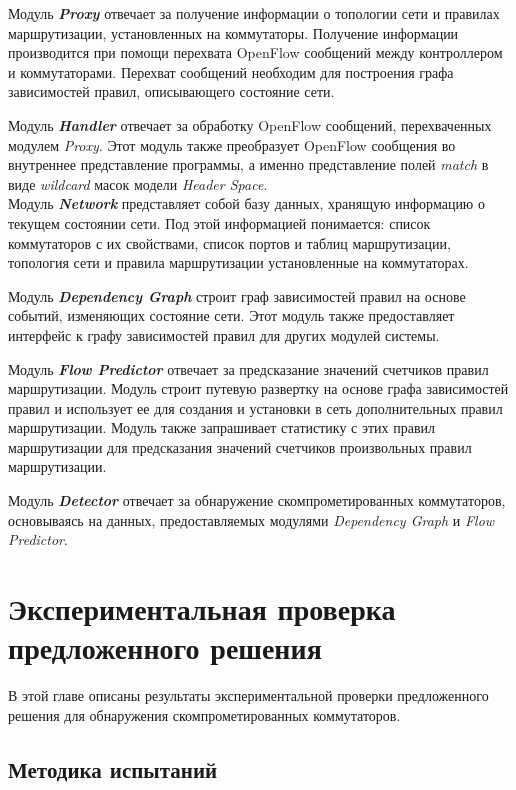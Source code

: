 \documentclass[../thesis.tex]{subfiles}
\begin{document}
Модуль \textbf{\textit{Proxy}} отвечает за получение информации о топологии сети и правилах маршрутизации, установленных на коммутаторы.
Получение информации производится при помощи перехвата OpenFlow сообщений между контроллером и коммутаторами.
Перехват сообщений необходим для построения графа зависимостей правил, описывающего состояние сети.

Модуль \textbf{\textit{Handler}} отвечает за обработку OpenFlow сообщений, перехваченных модулем \textit{Proxy}.
Этот модуль также преобразует OpenFlow сообщения во внутреннее представление программы, а именно представление полей \textit{match} в виде \textit{wildcard} масок модели \textit{Header Space}.
\\

Модуль \textbf{\textit{Network}} представляет собой базу данных, хранящую информацию о текущем состоянии сети.
Под этой информацией понимается: список коммутаторов с их свойствами, список портов и таблиц маршрутизации, топология сети и правила маршрутизации установленные на коммутаторах.

Модуль \textbf{\textit{Dependency Graph}} строит граф зависимостей правил на основе событий, изменяющих состояние сети.
Этот модуль также предоставляет интерфейс к графу зависимостей правил для других модулей системы.

Модуль \textbf{\textit{Flow Predictor}} отвечает за предсказание значений счетчиков правил маршрутизации.
Модуль строит путевую развертку на основе графа зависимостей правил и использует ее для создания и установки в сеть дополнительных правил маршрутизации.
Модуль также запрашивает статистику с этих правил маршрутизации для предсказания значений счетчиков произвольных правил маршрутизации.

Модуль \textbf{\textit{Detector}} отвечает за обнаружение скомпрометированных коммутаторов, основываясь на данных, предоставляемых модулями \textit{Dependency Graph} и \textit{Flow Predictor}.

\pagebreak
\section{Экспериментальная проверка предложенного решения}

В этой главе описаны результаты экспериментальной проверки предложенного решения для обнаружения скомпрометированных коммутаторов.

\subsection{Методика испытаний}
\end{document}
